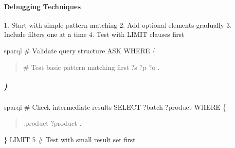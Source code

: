 \documentclass[letterpaper,10pt,english]{sphinxmanual}
\begin{document}
\paragraph{Debugging Techniques}
\label{\detokenize{api/sparql-api:debugging-techniques}}
\sphinxAtStartPar
{}
1. Start with simple pattern matching
2. Add optional elements gradually
3. Include filters one at a time
4. Test with LIMIT clauses first

\sphinxAtStartPar
{}
{\color{red}\bfseries{}\textasciigrave{}\textasciigrave{}}{\color{red}\bfseries{}\textasciigrave{}}sparql
\# Validate query structure
ASK WHERE \{
\begin{quote}

\sphinxAtStartPar
\# Test basic pattern matching first
?s ?p ?o .
\end{quote}


\subparagraph{\}}
\label{\detokenize{api/sparql-api:id151}}
\sphinxAtStartPar
{}
{\color{red}\bfseries{}\textasciigrave{}\textasciigrave{}}{\color{red}\bfseries{}\textasciigrave{}}sparql
\# Check intermediate results
SELECT ?batch ?product WHERE \{
\begin{quote}
\begin{description}
\sphinxAtStartPar
:product ?product .

\end{description}
\end{quote}

\sphinxAtStartPar
\}
LIMIT 5  \# Test with small result set first
{\color{red}\bfseries{}\textasciigrave{}\textasciigrave{}}{\color{red}\bfseries{}\textasciigrave{}}
\end{document}
